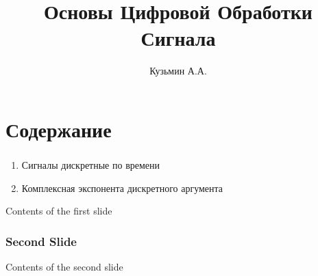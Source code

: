 \documentclass{beamer}
\title{Основы Цифровой Обработки Сигнала}
\author{Кузьмин А.А.}
\begin{document}
\maketitle

\section{Содержание}

\begin{frame}
  \frametitle{\insertsection}
  
  \begin{enumerate}
  \item Сигналы дискретные по времени \pause
  \item Комплексная экспонента дискретного аргумента
  \end{enumerate}

  Contents of the first slide
\end{frame}
\begin{frame}
  \frametitle{Second Slide}
  Contents of the second slide
\end{frame}
\end{document}
